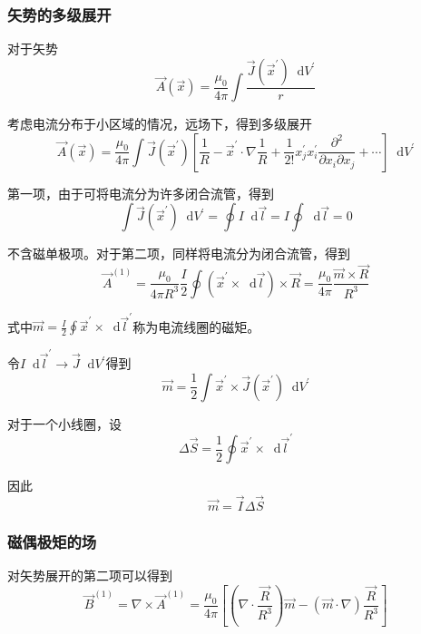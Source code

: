\documentclass[UTF8]{ctexart}
\newcommand*{\dif}{\mathop{}\!\mathrm{d}}
\begin{document}
    \subsubsection{矢势的多级展开}
    对于矢势
    \begin{equation}
        \vec{A}(\vec{x})= \frac{\mu_0}{4 \pi} \int \frac{\vec{J}(\vec{x}^{\prime}) \dif V^{\prime}}{r} 
    \end{equation}

\noindent 考虑电流分布于小区域的情况，远场下，得到多级展开
\begin{equation}
    \vec{A} (\vec{x}) = \frac{\mu_0}{4 \pi }\int \vec{J}(\vec{x}^{\prime}) \left[\frac{1}{R} - \vec{x}^{\prime} \cdot \nabla \frac{1}{R} + \frac{1}{2!}x_j^{\prime} x_i^{\prime} \frac{\partial^2 }{\partial x_i \partial x_j} + \cdots\right] \dif V^{\prime}
\end{equation}

    第一项，由于可将电流分为许多闭合流管，得到
    \begin{equation}
        \int \vec{J}(\vec{x}^{\prime}) \dif V^{\prime} = \oint I \dif \vec{l} = I \oint \dif \vec{l} = 0
    \end{equation}

\noindent 不含磁单极项。对于第二项，同样将电流分为闭合流管，得到
\begin{equation}
    \vec{A}^{(1)} = \frac{\mu_0}{4 \pi R^3}\frac{I}{2} \oint (\vec{x}^{\prime} \times \dif \vec{l})\times \vec{R} = \frac{\mu_0}{4 \pi} \frac{\vec{m} \times \vec{R}}{R^3}
\end{equation}

\noindent 式中$\vec{m} = \frac{I}{2} \oint \vec{x}^{\prime} \times \dif \vec{l}^{\prime}$称为电流线圈的磁矩。

    令$I \dif \vec{l}^{\prime} \rightarrow \vec{J} \dif V^{\prime}$得到
    \begin{equation}
        \vec{m} = \frac{1}{2} \int \vec{x}^{\prime} \times \vec{J}(\vec{x}^{\prime}) \dif V^{\prime}
    \end{equation}

\noindent 对于一个小线圈，设
\begin{equation}
    \Delta \vec{S} = \frac{1}{2} \oint \vec{x}^{\prime} \times \dif \vec{l}^{\prime}
\end{equation}

\noindent 因此
\begin{equation}
    \vec{m} = \vec{I} \Delta \vec{S}
\end{equation}

    \subsubsection{磁偶极矩的场}
    对矢势展开的第二项可以得到
    \begin{equation}
        \vec{B}^{(1)} = \nabla \times \vec{A}^{(1)} = \frac{\mu_0}{4 \pi } \left[(\nabla \cdot \frac{\vec{R}}{R^3})\vec{m} - (\vec{m} \cdot \nabla) \frac{\vec{R}}{R^3}\right]
    \end{equation}
\end{document}
